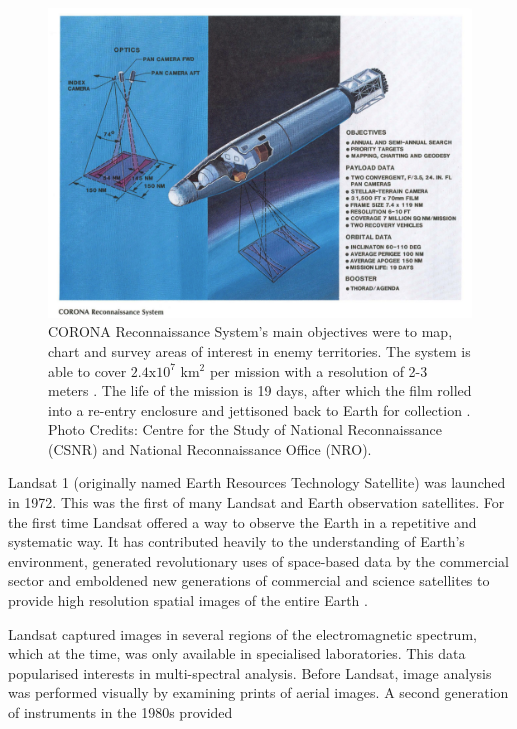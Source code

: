 \begin{figure}[H]
\centering
\includegraphics[totalheight=0.3\textheight]{CORONA REC .png}
\caption{CORONA Reconnaissance System's main objectives were to map, chart and survey areas of interest in enemy territories. The system is able to cover $\mathrm{2.4x10^{7}}$ km$^{2}$ per mission with a resolution of 2-3 meters \cite{CORONA}. The life of the mission is 19 days, after which the film rolled into a re-entry enclosure and jettisoned back to Earth for collection \cite{CORONA}. Photo Credits: Centre for the Study of National Reconnaissance (CSNR) and National Reconnaissance Office (NRO).
}
\end{figure}


Landsat 1 (originally named Earth Resources Technology Satellite) was launched in 1972. This was the first of many Landsat and Earth observation satellites. For the first time Landsat offered a way to observe the Earth in a repetitive and systematic way. It has contributed heavily to the understanding of Earth's environment, generated revolutionary uses of space-based data by the commercial sector and emboldened new generations of commercial and science satellites to provide high resolution spatial images of the entire Earth \cite{campbell2011introduction, Williams:2006:0099-1112:1171}.
\par
Landsat captured images in several regions of the electromagnetic spectrum, which at the time, was only available in specialised laboratories. This data popularised interests in multi-spectral analysis. Before Landsat, image analysis was performed visually by examining prints of aerial images. A second generation of instruments in the 1980s provided

